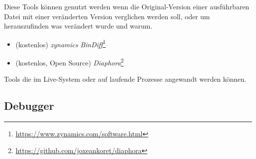 Diese Tools können genutzt werden wenn die Original-Version einer ausführbaren Datei
mit einer veränderten Version verglichen werden soll, oder um herauszufinden was
verändert wurde und warum.

\begin{itemize}
\item (kostenlos) \emph{zynamics BinDiff}\footnote{\url{https://www.zynamics.com/software.html}}

\item (kostenlos, Open Source) \emph{Diaphora}\footnote{\url{https://github.com/joxeankoret/diaphora}}
\end{itemize}


Tools die im Live-System oder auf laufende Prozesse angewandt werden können.

\subsection{Debugger}

\myindex{\olly}

